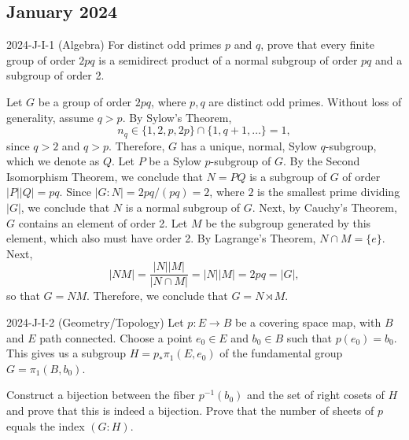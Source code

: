 \documentclass{article}
\begin{document}
\subsection{January 2024}
\begin{prb}{2024-J-I-1 (Algebra)}
	For distinct odd primes $p$ and $q$, prove that every finite group of order $2pq$ is a semidirect product of a normal subgroup of order $pq$ and a subgroup of order 2. 
\end{prb}
\begin{solutions}
	Let $G$ be a group of order $2pq$, where $p, q$ are distinct odd primes. Without loss of generality, assume $q > p$. By Sylow's Theorem, 
		\begin{equation}
			n_{q} \in \{1, 2, p, 2p\} \cap \{1, q + 1, \ldots\} = 1, 
		\end{equation}
	since $q > 2$ and $q > p$. Therefore, $G$ has a unique, normal, Sylow $q$-subgroup, which we denote as $Q$. Let $P$ be a Sylow $p$-subgroup of $G$. By the Second Isomorphism Theorem, we conclude that $N = PQ$ is a subgroup of $G$ of order $|P||Q| = pq$. Since $|G: N| = 2pq/(pq) = 2$, where $2$ is the smallest prime dividing $|G|$, we conclude that $N$ is a normal subgroup of $G$. Next, by Cauchy's Theorem, $G$ contains an element of order 2. Let $M$ be the subgroup generated by this element, which also must have order 2. By Lagrange's Theorem, $N \cap M = \{e\}$. Next, 
		\begin{equation}
			|NM| = \frac{|N||M|}{|N \cap M|} = |N||M| = 2pq = |G|,
		\end{equation}
	so that $G = NM$. Therefore, we conclude that $G = N \rtimes M$. 
\end{solutions}
\begin{prb}{2024-J-I-2 (Geometry/Topology)}
	Let $p: E \to B$ be a covering space map, with $B$ and $E$ path connected. Choose a point $e_{0} \in E$ and $b_{0} \in B$ such that $p(e_{0}) = b_{0}$. This gives us a subgroup $H = p_{\ast}\pi_{1}(E, e_{0})$ of the fundamental group $G = \pi_{1}(B, b_{0})$. 
	
	Construct a bijection between the fiber $p^{-1}(b_{0})$ and the set of right cosets of $H$ and prove that this is indeed a bijection. Prove that the number of sheets of $p$ equals the index $(G: H)$. 
\end{prb}
\end{document}
